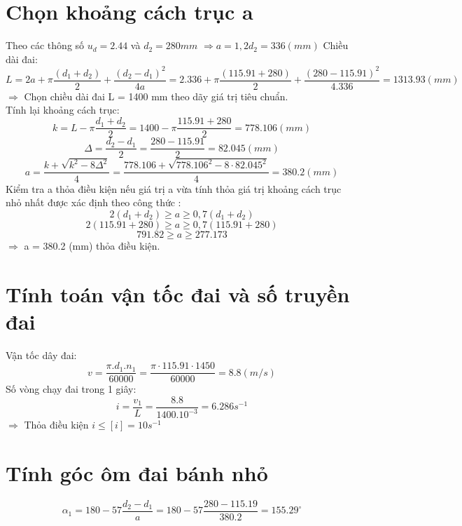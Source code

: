 \section{Chọn khoảng cách trục a}
Theo các thông số $u_d = 2.44$ và $d_2 = 280mm$ $\Rightarrow a = 1,2d_2 = 336 (mm)$ 
Chiều dài đai: \\
\[
    L = 2a + \pi\frac{(d_1 + d_2)}{2} + \frac{(d_2 - d_1)^2}{4a} = 2.336 + \pi\frac{(115.91 + 280)}{2} + \frac{(280 - 115.91)^2}{4.336} = 1313.93 (mm)
\]
$\Rightarrow$ Chọn chiều dài đai L = 1400 mm theo dãy giá trị tiêu chuẩn. \\
Tính lại khoảng cách trục: 
\[
    k = L - \pi\frac{d_1 + d_2}{2} = 1400 - \pi\frac{115.91 + 280}{2} =778.106 (mm)
\]
\[
    \Delta = \frac{d_2 - d_1}{2} = \frac{280 - 115.91}{2} = 82.045 (mm)
\]
\[
    a = \frac{k + \sqrt{k^2 - 8\Delta^2}}{4} = \frac{778.106 + \sqrt{778.106^2 - 8\cdot82.045^2}}{4} = 380.2 (mm)
\]
Kiểm tra a thỏa điều kiện nếu giá trị a vừa tính thỏa giá trị khoảng cách trục nhỏ
nhất được xác định theo công thức : \\
\[
    2(d_1+d_2) \geq a \geq 0,7(d_1+d_2)
\]
\[
    2(115.91+280) \geq a \geq 0,7(115.91+280)
\]
\[
    791.82 \geq a \geq 277.173
\]
$\Rightarrow$ a = 380.2 (mm) thỏa điều kiện. \\
\cleardoublepage
\section{Tính toán vận tốc đai và số truyền đai}
Vận tốc dây đai: \\
\[
    v = \frac{\pi.d_1.n_1}{60000} = \frac{\pi \cdot 115.91 \cdot 1450}{60000} = 8.8 (m/s)
\]
Số vòng chạy đai trong 1 giây: \\
\[
    i = \frac{v_1}{L} = \frac{8.8}{1400.10^{-3}} = 6.286s^{-1} 
\]
$\Rightarrow$ Thỏa điều kiện $i \leq [i] = 10s^{-1}$ \\
\section{Tính góc ôm đai bánh nhỏ}
\[
    \alpha_1 = 180 - 57\frac{d_2 - d_1}{a} = 180 - 57\frac{280 - 115.19}{380.2} = 155.29^{\circ}
\]
